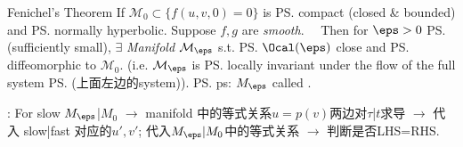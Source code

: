 \documentclass{note}
\begin{document}
\begin{MyTh}{Fenichel's Theorem}
    If $\mathcal{M}_0\subset \{f(u,v,0)=0\}$ is \ps{compact} {\tiny (closed \& bounded)} and \ps{normally hyperbolic}. Suppose $f,g$ are \textit{smooth}. \ \ Then for $\eps>0$ \ps{\tiny (sufficiently small)}, $\exists$ \textit{Manifold} $\mathcal{M}_\eps$ s.t. \ps{$\Ocal(\eps)$ close} and \ps{diffeomorphic} to $\mathcal{M}_0$. (i.e. $\mathcal{M}_\eps$ is \ps{locally invariant} under the flow of the full system \ps{\tiny (上面左边的system)}). \quad \ps{\tiny ps: $M_\eps$ called .}

    
    : {\tiny For slow $M_{\eps}$|$M_0$ $\to$ manifold 中的等式关系$u=p(v)$两边对$\tau$|$t$求导 $\to$ 代入 slow|fast 对应的$u',v'$; 代入$M_{\eps}|M_0$中的等式关系 $\to$ 判断是否LHS=RHS.}
\end{MyTh}
\end{document}
